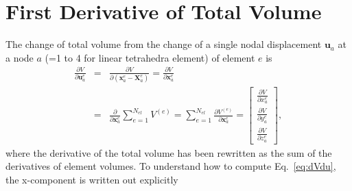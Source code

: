 \documentclass[12pt,aps,pre]{revtex4}
\begin{document}
\section{First Derivative of Total Volume}

The change of total volume from the change of a single nodal displacement $\pmb{u}_a$ at a node $a$ (=1 to 4 for linear tetrahedra element) of element $e$ is
%
\begin{eqnarray}
\frac{\partial V}{\partial \pmb{u}_a^e} &=& \frac{\partial V}{\partial (\pmb{x}_a^e-\pmb{X}_a^e)} = \frac{\partial V}{\partial \pmb{x}_a^e} \nonumber\\
&=& \frac{\partial}{\partial \pmb{x}_a^e} \sum_{e=1}^{N_{el}}V^{(e)} = \sum_{e=1}^{N_{el}}\frac{\partial V^{(e)}}{\partial \pmb{x}_a^e}
= \begin{bmatrix}
\frac{\partial V}{\partial x_a^e} \\ \frac{\partial V}{\partial y_a^e} \\ \frac{\partial V}{\partial z_a^e}
\end{bmatrix},
\label{eq:dVdu}
\end{eqnarray}
%
where the derivative of the total volume has been rewritten as the sum of the derivatives of element volumes. To understand how to compute Eq.\ \eqref{eq:dVdu}, the x-component is written out explicitly
%
\end{document}
